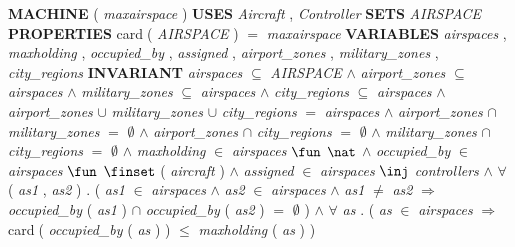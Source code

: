 %
\bsetindent
\begin{tabbing}
\bSetTabs
%
%
\bbnl
{\bf MACHINE} \bhsp{} ( {\em maxairspace\/} )  \-\label{Airspace}
%
%
\bbnl
{\bf USES} \+ \bbnl
{\em Aircraft\/}\label{Aircraft}  , {\em Controller\/}\label{Controller}  \-
%
%
\bbnl
{\bf SETS} \+ \bbnl
{\em AIRSPACE\/}\label{AIRSPACE}  \-
%
%
\bbnl
{\bf PROPERTIES} \+ \bbnl
 {\sf card}$\;$( {\em AIRSPACE\/} )  $=$ {\em maxairspace\/} \-
%
%
\bbnl
{\bf VARIABLES} \+ \bbnl
{\em airspaces\/}\label{airspaces}  , {\em maxholding\/}\label{maxholding}  , {\em occupied\_by\/}\label{occupied_by}  , {\em assigned\/}\label{assigned}  , \bnl
{\em airport\_zones\/}\label{airport_zones}  , {\em military\_zones\/}\label{military_zones}  , {\em city\_regions\/}\label{city_regions}  \-
%
%
\bbnl
{\bf INVARIANT} \+ \bbnl
{\em airspaces\/} $\subseteq$ {\em AIRSPACE\/} $\wedge$ \bnl
{\em airport\_zones\/} $\subseteq$ {\em airspaces\/} $\wedge$ \bnl
{\em military\_zones\/} $\subseteq$ {\em airspaces\/} $\wedge$ \bnl
{\em city\_regions\/} $\subseteq$ {\em airspaces\/} $\wedge$ \bnl
{\em airport\_zones\/} $\cup$ {\em military\_zones\/} $\cup$ {\em city\_regions\/} $=$ {\em airspaces\/} $\wedge$ \bnl
{\em airport\_zones\/} $\cap$ {\em military\_zones\/} $=$  $\emptyset$  $\wedge$ \bnl
{\em airport\_zones\/} $\cap$ {\em city\_regions\/} $=$  $\emptyset$  $\wedge$ \bnl
{\em military\_zones\/} $\cap$ {\em city\_regions\/} $=$  $\emptyset$  $\wedge$ \bnl
{\em maxholding\/} $\in$ {\em airspaces\/} $\fun$  $\nat$  $\wedge$ \bnl
{\em occupied\_by\/} $\in$ {\em airspaces\/} $\fun$  $\finset$ ( {\em aircraft\/}\label{aircraft}  ) $\wedge$ \bnl
{\em assigned\/} $\in$ {\em airspaces\/} $\inj$ {\em controllers\/}\label{controllers}  $\wedge$ \bnl
$\forall$ ( {\em as1\/} , {\em as2\/} ) . ( {\em as1\/} $\in$ {\em airspaces\/} $\wedge$
{\em as2\/} $\in$ {\em airspaces\/} $\wedge$ \bnl
{\em as1\/} $\neq$ {\em as2\/} $\Rightarrow$ \bnl
{\em occupied\_by\/} ( {\em as1\/} )  $\cap$ {\em occupied\_by\/} ( {\em as2\/} )  $=$  $\emptyset$  ) $\wedge$ \bnl
$\forall$ {\em as\/} . ( {\em as\/} $\in$ {\em airspaces\/} $\Rightarrow$
{\sf card}$\;$( {\em occupied\_by\/} ( {\em as\/} )  )  $\leq$ {\em maxholding\/} ( {\em as\/} )  )
\end{tabbing}
